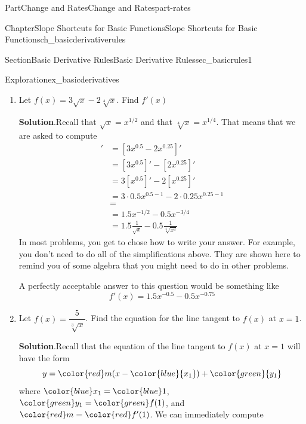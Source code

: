 \documentclass{tufte-book}
\newcommand{\blocktitlefont}{\relax}
\numberwithin{equation}{chapter}
\newcommand{\red}[1]{   {\color{red}   #1}   }
\newcommand{\blue}[1]{  {\color{blue}  #1}  }
\newcommand{\green}[1]{ {\color{green} #1} }
\newcommand{\amp}{&}
\begin{document}
\begin{partptx}{Part}{Change and Rates}{}{Change and Rates}{}{}{part-rates}
\begin{chapterptx}{Chapter}{Slope Shortcuts for Basic Functions}{}{Slope Shortcuts for Basic Functions}{}{}{ch_basicderivativerules}
\begin{sectionptx}{Section}{Basic Derivative Rules}{}{Basic Derivative Rules}{}{}{sec_basicrules1}
\begin{exploration}{Exploration}{}{ex_basicderivatives}
\begin{enumerate}[font=\bfseries,label=(\alph*),ref=\alph*]
\begin{align*}
[3x^{-1} + 5x^{-2}]' \amp = [3x^{-1}]' + [5x^{-2}]' \\
\amp = 3[x^{-1}]' + 5[x^{-2}]' \\
\amp = 3(-1) x^{-1-1} + 5(-2)x^{-2-1}\\
\amp = -3 x^{-2} - 10 x^{-3}\\
\amp = \dfrac{-3}{x^2} - \dfrac{10}{x^3}
\end{align*}
%
\item{}Let \(f(x) = 3\sqrt{x} - 2 \sqrt[4]{x}\).  Find \(f'(x)\)%
\par\smallskip%
\noindent\textbf{\blocktitlefont Solution}.\hypertarget{ex_basicderivatives-5-2}{}\quad{}Recall that \(\sqrt{x} = x^{1/2}\) and that \(\sqrt[4]{x} = x^{1/4}\).  That means that we are asked to compute%
\begin{align*}
[3 x^{1/2} - 2 x^{1/4}]' \amp = [3x^{0.5} - 2x^{0.25}]'\\
\amp =  [3 x^{0.5}]' - [2 x^{0.25}]'\\
\amp = 3[x^{0.5}]' -2[x^{0.25}]' \\
\amp = 3\cdot 0.5x^{0.5-1} - 2\cdot 0.25x^{0.25-1}\\
\amp = \\
\amp = 1.5 x^{-1/2} - 0.5 x^{-3/4}\\
\amp = 1.5 \frac{1}{\sqrt{x}} - 0.5 \frac{1}{\sqrt[4]{x^3}}
\end{align*}
In most problems, you get to chose how to write your answer.  For example, you don't need to do all of the simplifications above. They are shown here to remind you of some algebra that you might need to do in other problems.%
\par
A perfectly acceptable answer to this question would be something like%
\begin{equation*}
f'(x) = 1.5 x^{-0.5} - 0.5 x^{-0.75}
\end{equation*}
%
\item{}Let \(f(x) = \dfrac{5}{\sqrt[3]{x}}\).  Find the equation for the line tangent to \(f(x)\) at \(x=1\).%
\par\smallskip%
\noindent\textbf{\blocktitlefont Solution}.\hypertarget{ex_basicderivatives-6-2}{}\quad{}Recall that the equation of the line tangent to \(f(x)\) at \(x=1\) will have the form%
\begin{equation*}
y = \red{ m} (x - \blue{ {x_1}}) + \green{{ y_1}}
\end{equation*}
where \(\blue{x_1} = \blue 1\), \(\green{y_1} = \green{ f(1)}\), and \(\red m = \red{ f'(1)}\).  We can immediately compute%
\begin{equation*}

\end{equation*}
\end{enumerate}
\end{exploration}
\end{sectionptx}
\end{chapterptx}
\end{partptx}
\end{document}

